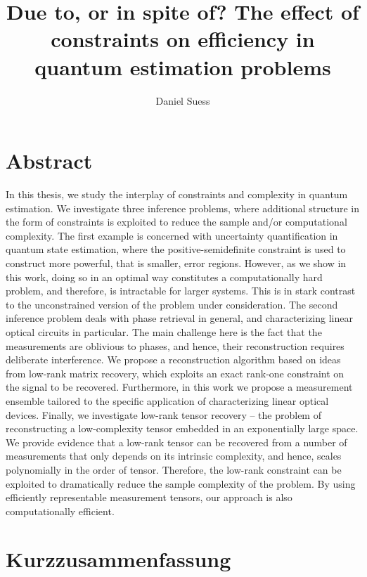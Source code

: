 \documentclass[a4paper,11pt,BCOR=8mm,twoside,headsepline]{scrbook}
\author{Daniel Suess}
\title{Due to, or in spite of? The effect of constraints on efficiency in quantum estimation problems}
\begin{document}
\frontmatter
\maketitle
\chapter*{Abstract}

In this thesis, we study the interplay of constraints and complexity in quantum estimation.
We investigate three inference problems, where additional structure in the form of constraints is exploited to reduce the sample and/or computational complexity.
The first example is concerned with uncertainty quantification in quantum state estimation, where the positive-semidefinite constraint is used to construct more powerful, that is smaller, error regions.
However, as we show in this work, doing so in an optimal way constitutes a computationally hard problem, and therefore, is intractable for larger systems.
This is in stark contrast to the unconstrained version of the problem under consideration.
The second inference problem deals with phase retrieval in general, and characterizing linear optical circuits in particular.
The main challenge here is the fact that the measurements are oblivious to phases, and hence, their reconstruction requires deliberate interference.
We propose a reconstruction algorithm based on ideas from low-rank matrix recovery, which exploits an exact rank-one constraint on the signal to be  recovered.
Furthermore, in this work we propose a measurement ensemble tailored to the specific application of characterizing linear optical devices.
Finally, we investigate low-rank tensor recovery -- the problem of reconstructing a low-complexity tensor embedded in an exponentially large space.
We provide evidence that a low-rank tensor can be recovered from a number of measurements that only depends on its intrinsic complexity, and hence, scales polynomially in the order of tensor.
Therefore, the low-rank constraint can be exploited to dramatically reduce the sample complexity of the problem.
By using efficiently representable measurement tensors, our approach is also computationally efficient.

\chapter*{Kurzzusammenfassung}
\end{document}
